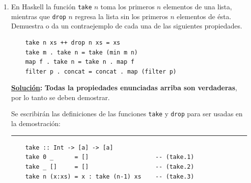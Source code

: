 \documentclass[11pt,letterpaper]{article}
\newcommand{\sol}{\textbf{\underline{Solución}: }} %
\begin{document}
\begin{enumerate}
\begin{proof}
    \begin{itemize}
    \item \texttt{xs = []}
    
    \begin{verbatim}
    (sum . sort) xs
            = (sum . sort) []    -- Tomando xs = []
            = sum (sort [])      -- Composición de funciones
            = sum []             -- Por (sort.1)
            = sum xs             -- Tomando [] = xs
    \end{verbatim}
    
    \item \texttt{xs = y:ys}
    \begin{verbatim}
        (sum . sort) xs
                = (sum . sort) y:ys    -- Tomando xs = y:ys
                = sum (sort y:ys)      -- Composición de funciones
                = sum y':ys'           -- Por (sort.2) Es la misma lista salvo orden
                = sum xs               -- Tomando y:ys = xs
    \end{verbatim}
\end{itemize}
\end{proof}


\item En Haskell la función \textcolor{WildStrawberry}{\texttt{take}} $n$ toma los primeros $n$
elementos de una lista, mientras que \textcolor{WildStrawberry}{\texttt{drop}} $n$
regresa la lista sin los primeros $n$ elementos de ésta. Demuestra o da un contraejemplo de cada
una de las siguientes propiedades.

\begin{verbatim}
    take n xs ++ drop n xs = xs
    take m . take n = take (min m n)
    map f . take n = take n . map f
    filter p . concat = concat . map (filter p)
\end{verbatim}

\sol \textcolor{WildStrawberry}{\textbf{Todas la propiedades enunciadas arriba son verdaderas}},
por lo tanto se deben demostrar.

Se escribirán las definiciones de las funciones \textcolor{WildStrawberry}{\texttt{take}} y
\textcolor{WildStrawberry}{\texttt{drop}} para ser usadas en la demostración:

\noindent
{\color{WildStrawberry} \rule{\linewidth}{0.4mm} }

\begin{verbatim}
    take :: Int -> [a] -> [a]
    take 0 _      = []                   -- (take.1)
    take _ []     = []                   -- (take.2)
    take n (x:xs) = x : take (n-1) xs    -- (take.3)
\end{verbatim}


\end{enumerate}
\end{document}
